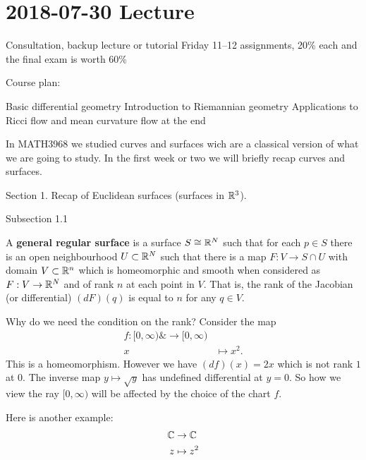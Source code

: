 \section{2018-07-30 Lecture}

\begin{itm}
  \io Consultation, backup lecture or tutorial Friday 11--12
   assignments, 20\% each and the final exam is worth 60\%
\end{itm}

Course plan:
\begin{itm}
  \io Basic differential geometry
  \io Introduction to Riemannian geometry
  \io Applications to Ricci flow and mean curvature flow at the end
\end{itm}

In MATH3968 we studied curves and surfaces wich are a classical version of what we are going to study.
In the first week or two we will briefly recap curves and surfaces.

Section 1. Recap of Euclidean surfaces (surfaces in $\mathbb{R}^3$).

Subsection 1.1

\begin{defn}[1.1]
  A \textbf{general regular surface} is a surface $S \cong \mathbb{R}^N$ such that for each $p \in S$ there is an open neighbourhood $U \subset \mathbb{R}^N$ such that there is a map $F: V \to S \cap U$ with domain $V \subset \mathbb{R}^n$ which is homeomorphic and smooth when considered as $F: V \to \mathbb{R}^N$ and of rank $n$ at each point in $V$.
  That is, the rank of the Jacobian (or differential) $(dF)(q)$ is equal to $n$ for any $q \in V$.
\end{defn}

\begin{rmk}
  Why do we need the condition on the rank?
  Consider the map
  \begin{align*}
    f: [0,\infty) \&\to [0,\infty) \\
    x &\mapsto x^2.
  \end{align*}
  This is a homeomorphism.
  However we have $(df)(x)=2x$ which is not rank $1$ at $0$.
  The inverse map $y \mapsto \sqrt{y}$ has undefined differential at $y=0$.
  So how we view the ray $[0,\infty)$ will be affected by the choice of the chart $f$.

  Here is another example:
  \begin{align*}
    \mathbb{C} &\to \mathbb{C} \\
    z &\mapsto z^2
  \end{align*}
\end{rmk}

